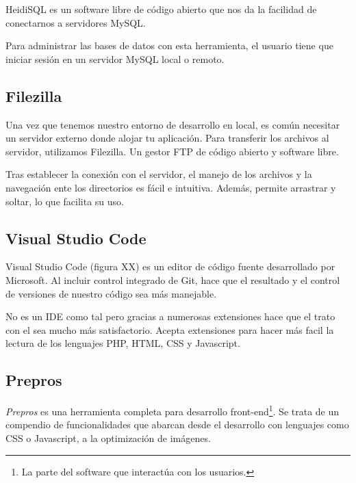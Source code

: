 HeidiSQL es un software libre de código abierto que nos da la facilidad de conectarnos a servidores MySQL.

Para administrar las bases de datos con esta herramienta, el usuario tiene que iniciar sesión en un servidor MySQL local o remoto. 


\subsection{Filezilla}

Una vez que tenemos nuestro entorno de desarrollo en local, es común necesitar un servidor externo donde alojar tu aplicación. Para transferir los archivos al servidor, utilizamos Filezilla. Un gestor FTP de código abierto y software libre.

Tras establecer la conexión con el servidor, el manejo de los archivos y la navegación ente los directorios es fácil e intuitiva. Además, permite arrastrar y soltar, lo que facilita su uso.


\subsection{Visual Studio Code}

Visual Studio Code (figura XX) es un editor de código fuente desarrollado por Microsoft. Al incluir control integrado de Git, hace que el resultado y el control de versiones de nuestro código sea más manejable.

No es un IDE como tal pero gracias a numerosas extensiones hace que el trato con el sea mucho más satisfactorio. Acepta extensiones para hacer más facil la lectura de los lenguajes PHP, HTML, CSS y Javascript. 


\subsection{Prepros}

\textit{Prepros} es una herramienta completa para desarrollo front-end\footnote{La parte del software que interactúa con los usuarios.}. Se trata de un compendio de funcionalidades que abarcan desde el desarrollo con lenguajes como CSS o Javascript, a la optimización de imágenes.

